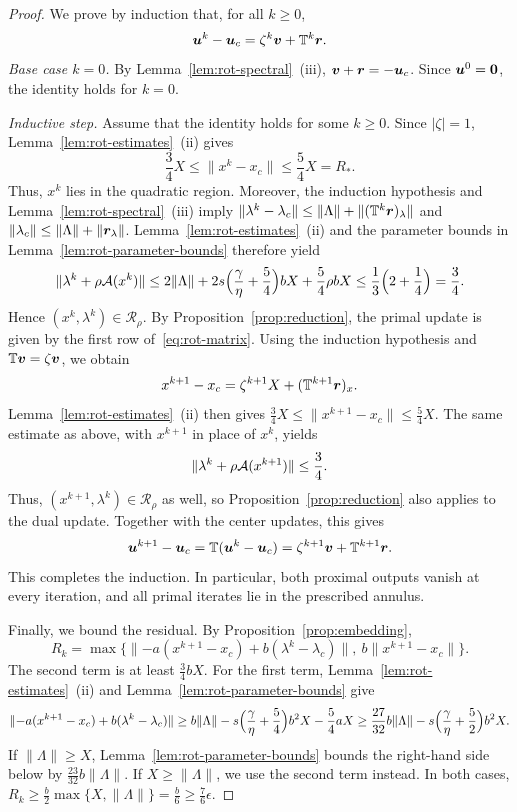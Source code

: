 \begin{proof}
We prove by induction that, for all \(k\ge0\),
\[
\bm{u}^k-\bm{u}_c=\zeta^k\bm{v}+\mathbb T^k\bm{r}.
\]
\emph{Base case \(k=0\).} By Lemma~\ref{lem:rot-spectral}~(iii),
\(\bm{v}+\bm{r}=-\bm{u}_c\). Since \(\bm{u}^0=\bm{0}\), the identity holds for \(k=0\).

\emph{Inductive step.} Assume that the identity holds for some \(k\ge0\).
Since \(|\zeta|=1\), Lemma~\ref{lem:rot-estimates}~(ii) gives
\[
\frac34X\le\|x^k-x_c\|\le\frac54X=R_*.
\]
Thus, \(x^k\) lies in the quadratic region. Moreover, the induction
hypothesis and Lemma~\ref{lem:rot-spectral}~(iii) imply
\(\|\lambda^k-\lambda_c\|\le\|\Lambda\|+\|(\mathbb T^k\bm{r})_\lambda\|\)
and \(\|\lambda_c\|\le\|\Lambda\|+\|\bm{r}_\lambda\|\).
Lemma~\ref{lem:rot-estimates}~(ii) and the parameter bounds in
Lemma~\ref{lem:rot-parameter-bounds} therefore yield
\[
\|\lambda^k+\rho\mathcal{A}(x^k)\|
\le2\|\Lambda\|+2s\Bigl(\frac{\gamma}{\eta}+\frac54\Bigr)bX+\frac54\rho bX
\le\frac13\Bigl(2+\frac14\Bigr)=\frac34.
\]
Hence \((x^k,\lambda^k)\in\mathcal R_\rho\). By
Proposition~\ref{prop:reduction}, the primal update is given by the first
row of~\eqref{eq:rot-matrix}. Using the induction hypothesis and
\(\mathbb T\bm{v}=\zeta\bm{v}\), we obtain
\[
x^{k+1}-x_c=\zeta^{k+1}X+(\mathbb T^{k+1}\bm{r})_x.
\]
Lemma~\ref{lem:rot-estimates}~(ii) then gives
\(\frac34X\le\|x^{k+1}-x_c\|\le\frac54X\).
The same estimate as above, with \(x^{k+1}\) in place of \(x^k\), yields
\[
\|\lambda^k+\rho\mathcal{A}(x^{k+1})\|\le\frac34.
\]
Thus, \((x^{k+1},\lambda^k)\in\mathcal R_\rho\) as well, so
Proposition~\ref{prop:reduction} also applies to the dual update.
Together with the center updates, this gives
\[
\bm{u}^{k+1}-\bm{u}_c
=\mathbb T(\bm{u}^k-\bm{u}_c)
=\zeta^{k+1}\bm{v}+\mathbb T^{k+1}\bm{r}.
\]
This completes the induction. In particular, both proximal outputs vanish
at every iteration, and all primal iterates lie in the prescribed annulus.

Finally, we bound the residual. By Proposition~\ref{prop:embedding},
\[
R_k=\max\bigl\{\|{-a}(x^{k+1}-x_c)+b(\lambda^k-\lambda_c)\|,\
b\|x^{k+1}-x_c\|\bigr\}.
\]
The second term is at least \(\frac34bX\). For the first term,
Lemma~\ref{lem:rot-estimates}~(ii) and Lemma~\ref{lem:rot-parameter-bounds} give
\[
\|{-a}(x^{k+1}-x_c)+b(\lambda^k-\lambda_c)\|
\ge b\|\Lambda\|-s\Bigl(\frac{\gamma}{\eta}+\frac54\Bigr)b^2X-\frac54aX
\ge\frac{27}{32}b\|\Lambda\|-s\Bigl(\frac{\gamma}{\eta}+\frac52\Bigr)b^2X .
\]
If \(\|\Lambda\|\ge X\), Lemma~\ref{lem:rot-parameter-bounds} bounds the
right-hand side below by \(\frac{23}{32}b\|\Lambda\|\). If
\(X\ge\|\Lambda\|\), we use the second term instead. In both cases,
\(R_k\ge\frac b2\max\{X,\|\Lambda\|\}=\frac b6\ge\frac76\epsilon\).
\end{proof}

